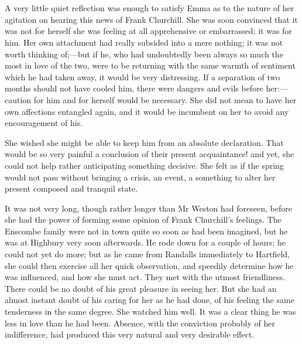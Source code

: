\chapter[Chapter \thechapter]{}
	
	\lettrine[lines=4,lraise=0.3]{A}{} very little quiet reflection was enough to satisfy Emma as to the nature of her agitation on hearing this news of Frank Churchill. She was soon convinced that it was not for herself she was feeling at all apprehensive or embarrassed; it was for him. Her own attachment had really subsided into a mere nothing; it was not worth thinking of;—but if he, who had undoubtedly been always so much the most in love of the two, were to be returning with the same warmth of sentiment which he had taken away, it would be very distressing. If a separation of two months should not have cooled him, there were dangers and evils before her:—caution for him and for herself would be necessary. She did not mean to have her own affections entangled again, and it would be incumbent on her to avoid any encouragement of his.

She wished she might be able to keep him from an absolute declaration. That would be so very painful a conclusion of their present acquaintance! and yet, she could not help rather anticipating something decisive. She felt as if the spring would not pass without bringing a crisis, an event, a something to alter her present composed and tranquil state.

It was not very long, though rather longer than Mr Weston had foreseen, before she had the power of forming some opinion of Frank Churchill's feelings. The Enscombe family were not in town quite so soon as had been imagined, but he was at Highbury very soon afterwards. He rode down for a couple of hours; he could not yet do more; but as he came from Randalls immediately to Hartfield, she could then exercise all her quick observation, and speedily determine how he was influenced, and how she must act. They met with the utmost friendliness. There could be no doubt of his great pleasure in seeing her. But she had an almost instant doubt of his caring for her as he had done, of his feeling the same tenderness in the same degree. She watched him well. It was a clear thing he was less in love than he had been. Absence, with the conviction probably of her indifference, had produced this very natural and very desirable effect.

